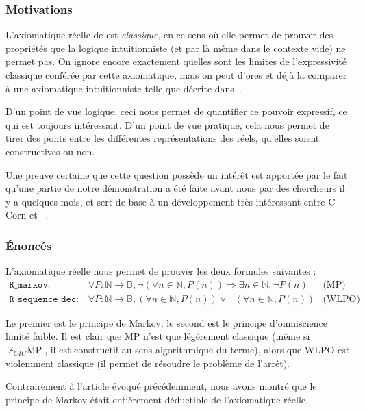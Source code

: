 \subsubsection{Motivations}

L'axiomatique réelle de \coq{} est \emph{classique}, en ce sens où elle permet de prouver des propriétés que la logique intuitionniste (et par là même \coq{} dans le contexte vide) ne permet pas. On ignore encore exactement quelles sont les limites de l'expressivité classique conférée par cette axiomatique, mais on peut d'ores et déjà la comparer à une axiomatique intuitionniste telle que décrite dans~\cite{Ciaffaglione00}.

D'un point de vue logique, ceci nous permet de quantifier ce pouvoir expressif, ce qui est toujours intéressant. D'un point de vue pratique, cela nous permet de tirer des ponts entre les différentes représen\-tations des réels, qu'elles soient constructives ou non.

Une preuve certaine que cette question possède un intérêt est apportée par le fait qu'une partie de notre démonstration a été faite avant nous par des chercheurs il y a quelques mois, et sert de base à un développement très intéressant entre C-Corn et \coq{}~\cite{DBLP08}.

\subsubsection{Énoncés}

L'axiomatique réelle nous permet de prouver les deux formules suivantes :
$$\begin{array}{llc}
\mathtt{R\_markov} :& \forall P : \mathbb{N}\rightarrow\mathbb{B}, \neg(\forall n\in\mathbb{N}, P(n)) \Rightarrow \exists n\in\mathbb{N}, \neg P(n) & \text{(MP)}\\
\mathtt{R\_sequence\_dec} :& \forall P : \mathbb{N}\rightarrow\mathbb{B}, (\forall n\in\mathbb{N}, P(n)) \vee \neg(\forall n\in\mathbb{N}, P(n)) & \text{(WLPO)}
\end{array}$$

Le premier est le principe de Markov, le second est le principe d'omniscience limité faible. Il est clair que MP n'est que légèrement classique (même si $\not\vdash_{CIC}\text{MP}$, il est constructif au sens algorithmique du terme), alors que WLPO est violemment classique (il permet de résoudre le problème de l'arrêt).

Contrairement à l'article évoqué précédemment, nous avons montré que le principe de Markov était entièrement déductible de l'axiomatique réelle.

